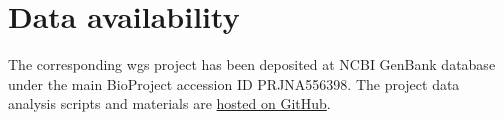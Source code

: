 \section{Data availability}\label{sec:data}
The corresponding \gls{wgs} project has been deposited at NCBI GenBank database under the main
BioProject accession ID PRJNA556398.
The project data analysis scripts and materials are
\href{https://github.com/ivasilyev/curated_projects/tree/master/inicolaeva/klebsiella_infants}
{hosted on GitHub}.
